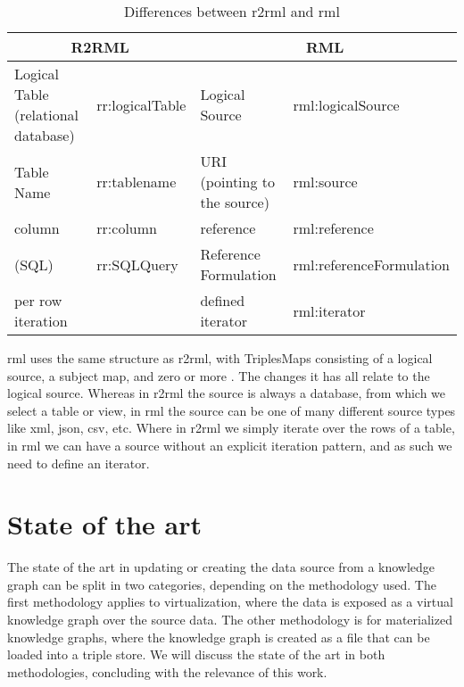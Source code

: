 \begin{table}[]
    \begin{tabular}{|ll|ll|}
        \hline
        \multicolumn{2}{|c|}{R2RML}         & \multicolumn{2}{c|}{RML}                                                           \\ \hline
        Logical Table (relational database) & rr:logicalTable          & Logical Source               & rml:logicalSource        \\ \hline
        Table Name                          & rr:tablename             & URI (pointing to the source) & rml:source               \\ \hline
        column                              & rr:column                & reference                    & rml:reference            \\ \hline
        (SQL)                               & rr:SQLQuery              & Reference Formulation        & rml:referenceFormulation \\ \hline
        per row iteration                   &                          & defined iterator             & rml:iterator             \\ \hline
    \end{tabular}
    \caption{Differences between \acrshort{r2rml} and \acrshort{rml}}
    \label{tab:r2rml_rml_differences}
\end{table}

\acrshort{rml} uses the same structure as \acrshort{r2rml}, with TriplesMaps consisting of a logical source, a subject map, and zero or more . The changes it has all relate to the logical source. Whereas in \acrshort{r2rml} the source is always a database, from which we select a table or view, in \acrshort{rml} the source can be one of many different source types like \acrshort{xml}, \acrshort{json}, \acrshort{csv}, etc. Where in \acrshort{r2rml} we simply iterate over the rows of a table, in \acrshort{rml} we can have a source without an explicit iteration pattern, and as such we need to define an iterator.


\section{State of the art}
The state of the art in updating or creating the data source from a knowledge graph can be split in two categories, depending on the methodology used. The first methodology applies to virtualization, where the data is exposed as a virtual knowledge graph over the source data. The other methodology is for materialized knowledge graphs, where the knowledge graph is created as a file that can be loaded into a triple store. We will discuss the state of the art in both methodologies, concluding with the relevance of this work.

